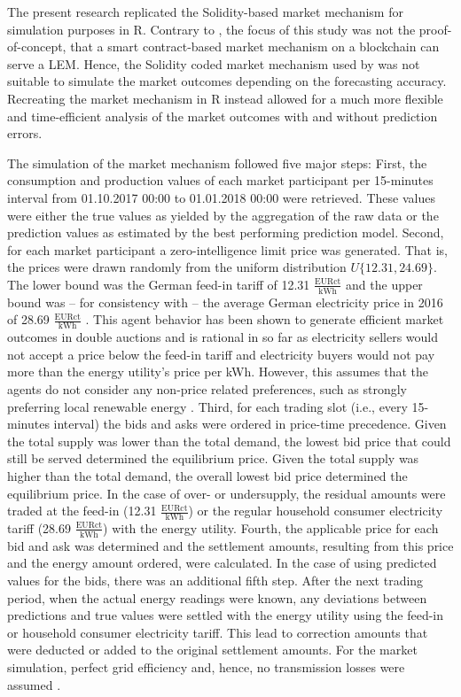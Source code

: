 The present research replicated the Solidity-based market mechanism for simulation purposes in R. Contrary to \citet{Mengelkamp:2018a}, the focus of this study was not the proof-of-concept, that a smart contract-based market mechanism on a blockchain can serve a LEM. Hence, the Solidity coded market mechanism used by \citet{Mengelkamp:2018a} was not suitable to simulate the market outcomes depending on the forecasting accuracy. Recreating the market mechanism in R instead allowed for a much more flexible and time-efficient analysis of the market outcomes with and without prediction errors.

The simulation of the market mechanism followed five major steps: First, the consumption and production values of each market participant per 15-minutes interval from 01.10.2017 00:00 to 01.01.2018 00:00 were retrieved. These values were either the true values as yielded by the aggregation of the raw data or the prediction values as estimated by the best performing prediction model. Second, for each market participant a zero-intelligence limit price was generated. That is, the prices were drawn randomly from the uniform distribution $\textit{U}\{12.31,24.69\}$. The lower bound was the German feed-in tariff of 12.31 $\frac{\text{EURct}}{\text{kWh}}$ and the upper bound was -- for consistency with \citet{Mengelkamp:2018a} -- the average German electricity price in 2016 of 28.69 $\frac{\text{EURct}}{\text{kWh}}$ \citep{Heidjann:2017}. This agent behavior has been shown to generate efficient market outcomes in double auctions \citep{Gode:1993} and is rational in so far as electricity sellers would not accept a price below the feed-in tariff and electricity buyers would not pay more than the energy utility's price per kWh. However, this assumes that the agents do not consider any non-price related preferences, such as strongly preferring local renewable energy \citep{Mengelkamp:2018a}. Third, for each trading slot (i.e., every 15-minutes interval) the bids and asks were ordered in price-time precedence. Given the total supply was lower than the total demand, the lowest bid price that could still be served determined the equilibrium price. Given the total supply was higher than the total demand, the overall lowest bid price determined the equilibrium price. In the case of over- or undersupply, the residual amounts were traded at the feed-in (12.31 $\frac{\text{EURct}}{\text{kWh}}$) or the regular household consumer electricity tariff (28.69 $\frac{\text{EURct}}{\text{kWh}}$) with the energy utility. Fourth, the applicable price for each bid and ask was determined and the settlement amounts, resulting from this price and the energy amount ordered, were calculated. In the case of using predicted values for the bids, there was an additional fifth step. After the next trading period, when the actual energy readings were known, any deviations between predictions and true values were settled with the energy utility using the feed-in or household consumer electricity tariff. This lead to correction amounts that were deducted or added to the original settlement amounts. For the market simulation, perfect grid efficiency and, hence, no transmission losses were assumed \citep{Mengelkamp:2017:Trading}.

